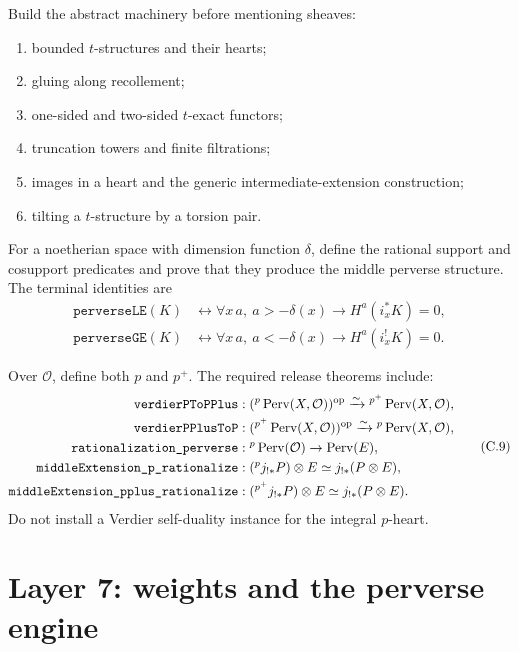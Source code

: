 Build the abstract machinery before mentioning sheaves:

\begin{enumerate}
\item bounded \(t\)-structures and their hearts;
\item gluing along recollement;
\item one-sided and two-sided \(t\)-exact functors;
\item truncation towers and finite filtrations;
\item images in a heart and the generic intermediate-extension construction;
\item tilting a \(t\)-structure by a torsion pair.
\end{enumerate}

For a noetherian space with dimension function \(\delta\), define the rational
support and cosupport predicates and prove that they produce the middle
perverse structure.  The terminal identities are
\[
\begin{aligned}
\texttt{perverseLE}(K)&\leftrightarrow
 \forall x\,a,\ a>-\delta(x)\to H^a(i_x^*K)=0,\\
\texttt{perverseGE}(K)&\leftrightarrow
 \forall x\,a,\ a<-\delta(x)\to H^a(i_x^!K)=0.
\end{aligned}
\tag{C.8}\label{eq:formalization-perverse-predicates}
\]

Over \(\mathcal O\), define both \(p\) and \(p^+\).  The required release
theorems include:
\[
\begin{aligned}
\texttt{verdierPToPPlus}&:
 ({}^p\operatorname{Perv}(X,\mathcal O))^{\mathrm{op}}
   \xrightarrow{\sim}{}^{p^+}\operatorname{Perv}(X,\mathcal O),\\
\texttt{verdierPPlusToP}&:
 ({}^{p^+}\operatorname{Perv}(X,\mathcal O))^{\mathrm{op}}
   \xrightarrow{\sim}{}^p\operatorname{Perv}(X,\mathcal O),\\
\texttt{rationalization\_perverse}&:
 {}^p\operatorname{Perv}(\mathcal O)\to\operatorname{Perv}(E),\\
\texttt{middleExtension\_p\_rationalize}&:
 ({}^pj_{!*}P)\otimes E\simeq j_{!*}(P\otimes E),\\
\texttt{middleExtension\_pplus\_rationalize}&:
 ({}^{p^+}j_{!*}P)\otimes E\simeq j_{!*}(P\otimes E).
\end{aligned}
\tag{C.9}\label{eq:formalization-integral-perverse}
\]
Do not install a Verdier self-duality instance for the integral \(p\)-heart.

\section{Layer 7: weights and the perverse engine}

